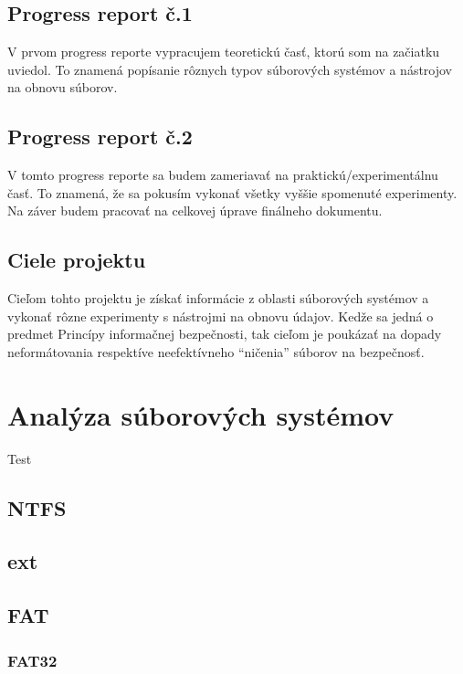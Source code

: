 \documentclass[12pt,oneside,slovak,a4paper]{article}
\begin{document}
\subsection{Progress report č.1}
V prvom progress reporte vypracujem teoretickú časť, ktorú som na začiatku uviedol. To znamená popísanie rôznych typov súborových systémov a nástrojov na obnovu súborov.

\subsection{Progress report č.2}
V tomto progress reporte sa budem zameriavať na praktickú/experimentálnu časť. To znamená, že sa pokusím vykonať všetky vyššie spomenuté experimenty. Na záver budem pracovať na celkovej úprave finálneho dokumentu.

\subsection{Ciele projektu}
Cieľom tohto projektu je získať informácie z oblasti súborových systémov a vykonať rôzne experimenty s nástrojmi na obnovu údajov. Kedže sa jedná o predmet Princípy informačnej bezpečnosti, tak cieľom je poukázať na dopady neformátovania respektíve neefektívneho ``ničenia'' súborov na bezpečnosť.



\section{Analýza súborových systémov}
Test\cite{TEST}
\subsection{NTFS}
\subsection{ext}
\subsection{FAT}
\subsubsection{FAT32}
\end{document}
